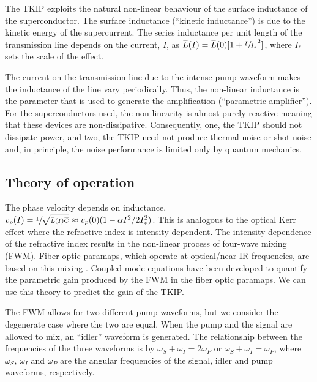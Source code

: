 The TKIP exploits the natural non-linear behaviour of the surface inductance of the superconductor.  The surface inductance (``kinetic inductance'') is due to the kinetic energy of the supercurrent. The series inductance per unit length of the transmission line depends on the current, $I$, as $\overbar{L}(I) = \overbar{L}(0)[1+ \sfrac{I}{I_*}^2]$, where $I_*$ sets the scale of the effect. 

The current on the transmission line due to the intense pump waveform makes the inductance of the line vary periodically. Thus, the non-linear inductance is the parameter that is used to generate the amplification (``parametric amplifier'').  For the superconductors used, the non-linearity is almost purely reactive meaning that these devices are non-dissipative. Consequently, one, the TKIP should not dissipate power, and two, the TKIP need not produce thermal noise or shot noise and, in principle, the noise performance is limited only by quantum mechanics.


\subsection*{Theory of operation}
The phase velocity depends on inductance, $v_{p}(I)= \sfrac{1}{\sqrt{\overbar{L}(I)\overbar{C}}} \approx v_{p}(0)(1 - \alpha I^2 / 2 I^2_*)$. This is analogous to the optical Kerr effect where the refractive index is intensity dependent. The intensity dependence  of the refractive index results in the non-linear process of four-wave mixing (FWM). Fiber optic paramaps, which operate at optical/near-IR frequencies, are based on this mixing \cite{Hansryd2002}. Coupled mode equations have been developed to quantify the parametric gain produced by the FWM in the fiber optic paramaps. We can use this theory \cite{Stolen1982} to predict the gain of the TKIP. 

 
The FWM allows for two different  pump waveforms, but we consider the degenerate case where the two are equal. When the pump and the signal are allowed to mix, an ``idler''  waveform is  generated. The relationship between the frequencies of the three waveforms is by $\omega_S+\omega_I = 2\omega_P$ or $\omega_S+\omega_I = \omega_P$, where $\omega_S$, $\omega_I$ and $\omega_P$ are the angular frequencies of the signal, idler and pump waveforms, respectively.


